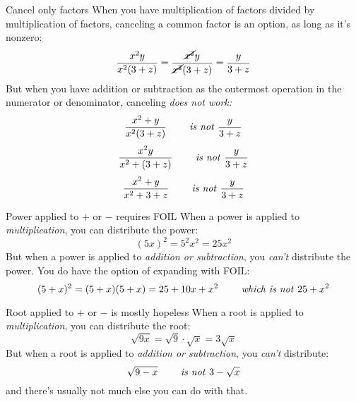 \begin{WarningBox}{Cancel only factors}
 When you have multiplication of factors divided by multiplication of factors,
 canceling a common factor is an option, as long as it's nonzero:
 \begin{equation*}
  \frac{x^2 y}{x^2 (3 + z)}
  = \frac{\cancel{x^2} y}{\cancel{x^2} (3 + z)}
  = \frac{y}{3 + z}
 \end{equation*}
 But when you have addition or subtraction as the outermost operation in the numerator or denominator, canceling \emph{does not work:}
 \begin{equation*}
  \frac{x^2 + y}{x^2 (3 + z)}
  \qquad \text{ \emph{is not} } \frac{y}{3 + z}
 \end{equation*}
 \begin{equation*}
  \frac{x^2 y}{x^2 + (3 + z)}
  \qquad \text{ \emph{is not} } \frac{y}{3 + z}
 \end{equation*}
 \begin{equation*}
  \frac{x^2 + y}{x^2 + 3 + z}
  \qquad \text{ \emph{is not} } \frac{y}{3 + z}
 \end{equation*}
\end{WarningBox}
\begin{WarningBox}{Power applied to $+$ or $-$ requires FOIL}
 When a power is applied to \emph{multiplication}, you can distribute the power:
 \begin{equation*}
  (5 x)^2 = 5^2 x^2 = 25 x^2
 \end{equation*}
 But when a power is applied to \emph{addition or subtraction}, you \emph{can't} distribute the power.
 You do have the option of expanding with FOIL:
 \begin{equation*}
  (5 + x)^2 = (5 + x)(5 + x) = 25 + 10x + x^2
  \qquad \text{ \emph{which is not} } 25 + x^2
 \end{equation*}
\end{WarningBox}
\begin{WarningBox}{Root applied to $+$ or $-$ is mostly hopeless}
 When a root is applied to \emph{multiplication}, you can distribute the root:
 \begin{equation*}
  \sqrt{9 x} = \sqrt{9} \cdot \sqrt{x} = 3 \sqrt{x}
 \end{equation*}
 But when a root is applied to \emph{addition or subtraction}, you \emph{can't} distribute:
 \begin{equation*}
  \sqrt{9 - x} \qquad \text{ \emph{is not} } 3 - \sqrt{x}
 \end{equation*}
 and there's usually not much else you can do with that.
\end{WarningBox}
